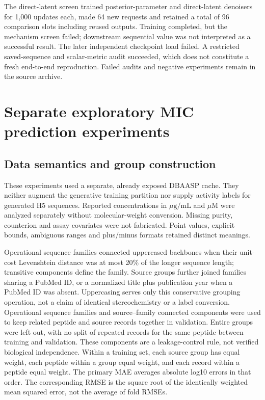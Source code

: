 \documentclass[12pt,a4paper]{article}
\newcommand{\ug}{\ensuremath{\mu\mathrm{g}/\mathrm{mL}}}
\begin{document}
The direct-latent screen trained posterior-parameter and direct-latent denoisers for 1,000 updates each, made 64 new requests and retained a total of 96 comparison slots including reused outputs. Training completed, but the mechanism screen failed; downstream sequential value was not interpreted as a successful result. The later independent checkpoint load failed. A restricted saved-sequence and scalar-metric audit succeeded, which does not constitute a fresh end-to-end reproduction. Failed audits and negative experiments remain in the source archive.

\section{Separate exploratory MIC prediction experiments}
\subsection{Data semantics and group construction}
These experiments used a separate, already exposed DBAASP cache. They neither augment the generative training partition nor supply activity labels for generated H5 sequences. Reported concentrations in \ug{} and $\mu$M were analyzed separately without molecular-weight conversion. Missing purity, counterion and assay covariates were not fabricated. Point values, explicit bounds, ambiguous ranges and plus/minus formats retained distinct meanings.

Operational sequence families connected uppercased backbones when their unit-cost Levenshtein distance was at most 20\% of the longer sequence length; transitive components define the family. Source groups further joined families sharing a PubMed ID, or a normalized title plus publication year when a PubMed ID was absent. Uppercasing serves only this conservative grouping operation, not a claim of identical stereochemistry or a label conversion. Operational sequence families and source--family connected components were used to keep related peptide and source records together in validation. Entire groups were left out, with no split of repeated records for the same peptide between training and validation. These components are a leakage-control rule, not verified biological independence. Within a training set, each source group has equal weight, each peptide within a group equal weight, and each record within a peptide equal weight. The primary MAE averages absolute log10 errors in that order. The corresponding RMSE is the square root of the identically weighted mean squared error, not the average of fold RMSEs.
\end{document}
